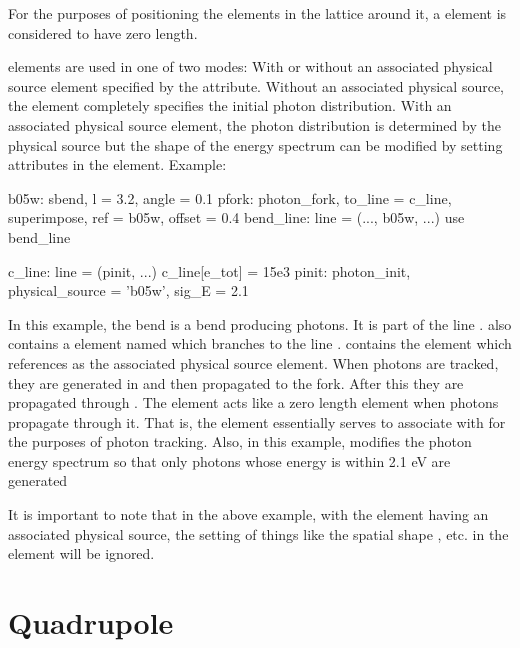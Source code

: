 {For the purposes of positioning the elements in the lattice around it,
a  element is considered to have zero length.

 elements are used in one of two modes: With or
without an associated physical source element specified by the
 attribute. Without an associated physical source,
the  element completely specifies the initial photon
distribution. With an associated physical source element, the photon
distribution is determined by the physical source but the shape of the
energy spectrum can be modified by setting attributes in the
 element. Example:
\begin{example}
  b05w: sbend, l = 3.2, angle = 0.1
  pfork: photon_fork, to_line = c_line, superimpose, ref = b05w, offset = 0.4
  bend_line: line = (..., b05w, ...)
  use bend_line

  c_line: line = (pinit, ...)
  c_line[e_tot] = 15e3
  pinit: photon_init, physical_source = 'b05w', sig_E = 2.1
\end{example}
In this example, the bend  is a bend producing photons. It is
part of the line .  also contains a
 element named  which branches to the line
.  contains the  element
 which references  as the associated physical
source element. When photons are tracked, they are generated in
 and then propagated to the  fork.  After this they
are propagated through . The  element acts like a
zero length  element when photons propagate through
it. That is, the  element essentially serves to associate
 with  for the purposes of photon tracking. Also,
in this example,  modifies the photon energy spectrum so
that only photons whose energy is within 2.1 eV are generated

It is important to note that in the above example, with the
 element having an associated physical source, the
setting of things like the spatial shape , etc. in the
 element will be ignored.

\section{Quadrupole}
\label{s:quad}

}
